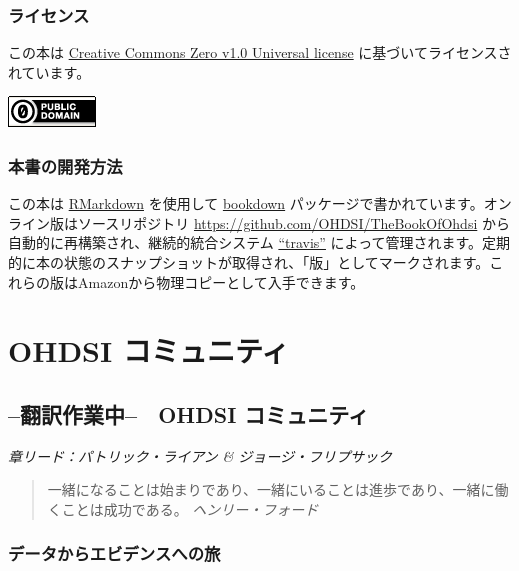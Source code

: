 \documentclass[
  11pt]{book}
\theoremstyle{definition}
\theoremstyle{definition}
\theoremstyle{definition}
\theoremstyle{definition}
\theoremstyle{remark}
\begin{document}
\section*{ライセンス}\label{ux30e9ux30a4ux30bbux30f3ux30b9}

この本は \href{http://creativecommons.org/publicdomain/zero/1.0/}{Creative Commons Zero v1.0 Universal license} に基づいてライセンスされています。

\includegraphics{images/Preface/cc0.png}

\section*{本書の開発方法}\label{ux672cux66f8ux306eux958bux767aux65b9ux6cd5}

この本は \href{https://rmarkdown.rstudio.com}{RMarkdown} を使用して \href{https://bookdown.org}{bookdown} パッケージで書かれています。オンライン版はソースリポジトリ \url{https://github.com/OHDSI/TheBookOfOhdsi} から自動的に再構築され、継続的統合システム \href{http://travis-ci.org/}{``travis''} によって管理されます。定期的に本の状態のスナップショットが取得され、「版」としてマークされます。これらの版はAmazonから物理コピーとして入手できます。

\mainmatter

\part{OHDSI コミュニティ}\label{part-ohdsi-ux30b3ux30dfux30e5ux30cbux30c6ux30a3}

\chapter{--翻訳作業中--　OHDSI コミュニティ}\label{OhdsiCommunity}

\emph{章リード：パトリック・ライアン \& ジョージ・フリプサック}

\begin{quote}
一緒になることは始まりであり、一緒にいることは進歩であり、一緒に働くことは成功である。 \emph{ヘンリー・フォード}
\end{quote}

\section{データからエビデンスへの旅}\label{ux30c7ux30fcux30bfux304bux3089ux30a8ux30d3ux30c7ux30f3ux30b9ux3078ux306eux65c5}
\end{document}
